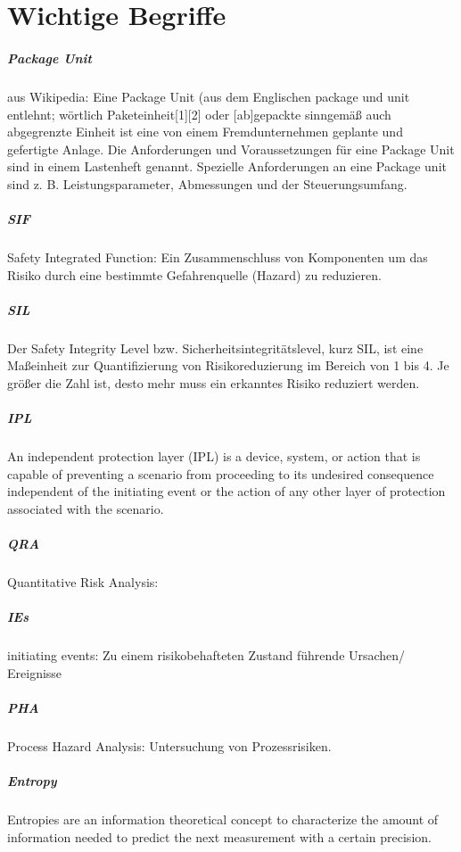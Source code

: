 \chapter{Wichtige Begriffe}
\paragraph*{Package Unit}
aus Wikipedia: \hfill \newline
Eine Package Unit (aus dem Englischen package und unit entlehnt; wörtlich Paketeinheit[1][2] oder [ab]gepackte sinngemäß auch abgegrenzte Einheit ist eine von einem Fremdunternehmen geplante und gefertigte Anlage. Die Anforderungen und Voraussetzungen für eine Package Unit sind in einem Lastenheft genannt. Spezielle Anforderungen an eine Package unit sind z. B. Leistungsparameter, Abmessungen und der Steuerungsumfang.
\paragraph*{SIF}
Safety Integrated Function: Ein Zusammenschluss von Komponenten um das Risiko durch eine bestimmte Gefahrenquelle (Hazard) zu reduzieren. 
\paragraph*{SIL}
Der Safety Integrity Level bzw. Sicherheitsintegritätslevel, kurz SIL, ist eine Ma\ss{}einheit zur Quantifizierung von Risikoreduzierung im Bereich von 1 bis 4. Je gr\"o\ss{}er die Zahl ist, desto mehr muss ein erkanntes Risiko reduziert werden. 
\paragraph*{IPL}
An independent protection layer (IPL) is a device, system, or action that is capable
of preventing a scenario from proceeding to its undesired consequence independent
of the initiating event or the action of any other layer of protection associated with
the scenario.
\paragraph*{QRA} Quantitative Risk Analysis: 
\paragraph*{IEs} initiating events: Zu einem risikobehafteten Zustand f\"uhrende Ursachen/ Ereignisse

\paragraph*{PHA} Process Hazard Analysis: Untersuchung von Prozessrisiken. 

\paragraph*{Entropy}Entropies are an information theoretical concept to
characterize the amount of information needed to predict the next measurement with a certain precision.